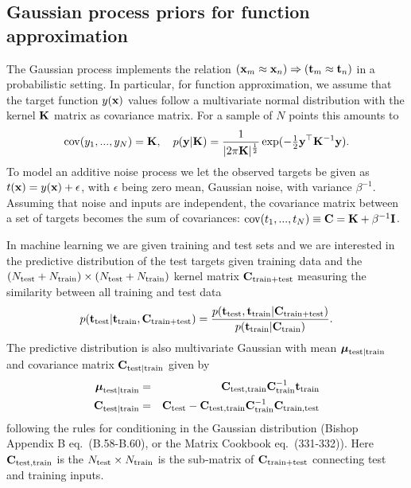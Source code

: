 \documentclass[12pt]{article}    %
\def\xb{{\bf x}}
\def\mub{\text{\boldmath $\mu$}}
\def\tb{{\bf t}}
\def\yb{{\bf y}}
\def\Kb{{\bf K}}
\def\Ib{{\bf I}}
\def\Cb{{\bf C}}
\begin{document}
\subsection*{Gaussian process priors for function approximation}
The Gaussian process implements the relation $(\xb_m \approx \xb_n) \Rightarrow (\tb_m \approx \tb_n)$ in a probabilistic setting. In particular, for function approximation, we assume that the target function $y(\xb)$ values follow a multivariate normal distribution with the kernel $\Kb$ matrix as covariance matrix. For a sample of $N$ points this amounts to
\begin{equation}
{\rm cov}(y_1,...,y_N) = \Kb, \ \ \ p(\yb|\Kb) = \frac{1}{|2\pi \Kb|^{\small \frac{1}{2}}} \exp( -{\textstyle \frac{1}{ 2}}\yb^{\top} \Kb^{-1}\yb).
\end{equation}
To model an additive noise process we let the observed targets  be given as $t(\xb) = y(\xb) + \epsilon $, with $\epsilon$ being zero mean, Gaussian noise, with variance $\beta^{-1}$. Assuming that noise and inputs are independent, the covariance matrix between a set of targets becomes the sum of covariances:  ${\rm cov}(t_1,...,t_N) \equiv \Cb = \Kb + \beta^{-1}\Ib$.

In machine learning we are given training and test sets and we are interested in the predictive distribution of the test targets given training data and the
$(N_{\rm test}+N_{\rm train})\times(N_{\rm test}+N_{\rm train})$ kernel matrix $\Cb_{\rm train+test}$ measuring the similarity between all training and test data
\begin{equation}
 p(\tb_{\rm test}|\tb_{\rm train},\Cb_{\rm train + test}) = \frac{p(\tb_{\rm test},\tb_{\rm train}|\Cb_{\rm train + test})}{p(\tb_{\rm train}|\Cb_{\rm train})}.
 \end{equation}
The predictive distribution is also multivariate Gaussian with mean $\mub_{{\rm test}|{\rm train}}$ and covariance matrix $\Cb_{{\rm test}|{\rm train}}$ given by
\begin{eqnarray}
\mub_{{\rm test}|{\rm train}} &=& \Cb_{{\rm test},{\rm train}}\Cb_{\rm train}^{-1}\tb_{\rm train} \label{conmean}\\
\Cb_{{\rm test}|{\rm train}} &=& \Cb_{\rm test} - \Cb_{{\rm test},{\rm train}}\Cb_{\rm train}^{-1}\Cb_{{\rm train},{\rm test}}  \label{postcov}
\end{eqnarray}
following the rules for conditioning in the Gaussian distribution (Bishop Appendix B eq.\ (B.58-B.60), or the Matrix Cookbook eq.\ (331-332)).
Here $\Cb_{{\rm test},{\rm train}}$ is the  $N_{\rm test}\times N_{\rm train}$ is the sub-matrix of  $\Cb_{\rm train+test}$ connecting test and training inputs.
\end{document}
